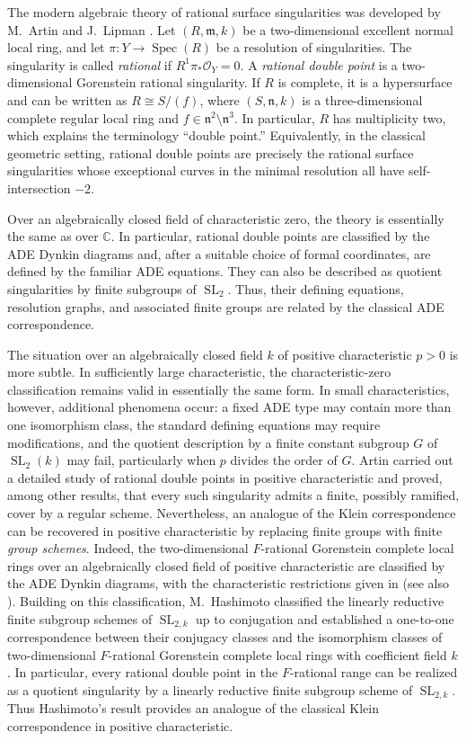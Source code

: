 \documentclass[uplatex,11pt,a4paper]{amsart} %
\numberwithin{equation}{section}
\numberwithin{figure}{section}
\numberwithin{table}{section}
\theoremstyle{plain}
\theoremstyle{definition}
\newcommand{\C}{\mathbb{C}}
\newcommand{\m}{\mathfrak{m}}
\newcommand{\n}{\mathfrak{n}}
\newcommand{\scrO}{\mathscr{O}}
\DeclareMathOperator{\SL}{SL}
\DeclareMathOperator{\Spec}{Spec}
\begin{document}
The modern algebraic theory of rational surface singularities was developed by M.~Artin \cite{Art66} and J.~Lipman \cite{Lip69}. Let $(R,\m,k)$ be a two-dimensional excellent normal local ring, and let $\pi\colon Y\to \Spec(R)$ be a resolution of singularities. The singularity is called \emph{rational} if $R^1\pi_*\scrO_Y=0$. A \emph{rational double point} is a two-dimensional Gorenstein rational singularity. If $R$ is complete, it is a hypersurface and can be written as $R\cong S/(f)$, where $(S,\n,k)$ is a three-dimensional complete regular local ring and $f\in\n^2\setminus\n^3$. In particular, $R$ has multiplicity two, which explains the terminology ``double point.''  Equivalently, in the classical geometric setting, rational double points are precisely the rational surface singularities whose exceptional curves in the minimal resolution all have self-intersection $-2$.

Over an algebraically closed field of characteristic zero, the theory is essentially the same as over $\C$. In particular, rational double points are classified by the ADE Dynkin diagrams and, after a suitable choice of formal coordinates, are defined by the familiar ADE equations. They can also be described as quotient singularities by finite subgroups of $\SL_2$. Thus, their defining equations, resolution graphs, and associated finite groups are related by the classical ADE correspondence.

The situation over an algebraically closed field $k$ of positive characteristic $p>0$ is more subtle. In sufficiently large characteristic, the characteristic-zero classification remains valid in essentially the same form. In small characteristics, however, additional phenomena occur: a fixed ADE type may contain more than one isomorphism class, the standard defining equations may require modifications, and the quotient description by a finite constant subgroup $G$ of $\SL_2(k)$ may fail, particularly when $p$ divides the order of $G$. Artin \cite{Art77} carried out a detailed study of rational double points in positive characteristic and proved, among other results, that every such singularity admits a finite, possibly ramified, cover by a regular scheme.
Nevertheless, an analogue of the Klein correspondence can be recovered in positive characteristic by replacing finite groups with finite \emph{group schemes}. Indeed, the two-dimensional $F$-rational Gorenstein complete local rings over an algebraically closed field of positive characteristic are classified by the ADE Dynkin diagrams, with the characteristic restrictions given in \cite[Example~18]{HL02} (see also \cite{WY00}). Building on this classification, M.~Hashimoto \cite{Has15} classified the linearly reductive finite subgroup schemes of $\SL_{2,k}$ up to conjugation and established a one-to-one correspondence between their conjugacy classes and the isomorphism classes of two-dimensional $F$-rational Gorenstein complete local rings with coefficient field $k$.
In particular, every rational double point in the $F$-rational range can be realized as a quotient singularity by a linearly reductive finite subgroup scheme of $\SL_{2,k}$. Thus Hashimoto's result provides an analogue of the classical Klein correspondence in positive characteristic.
\end{document}
